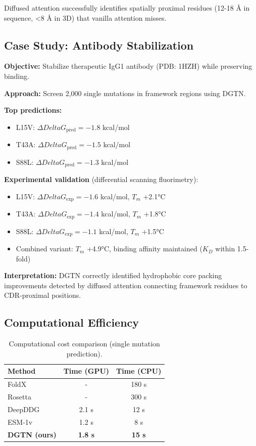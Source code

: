 \documentclass[11pt]{article}
\begin{document}
Diffused attention successfully identifies spatially proximal residues (12-18 Å in sequence, <8 Å in 3D) that vanilla attention misses.

\subsection{Case Study: Antibody Stabilization}

\textbf{Objective:} Stabilize therapeutic IgG1 antibody (PDB: 1HZH) while preserving binding.

\textbf{Approach:} Screen 2,000 single mutations in framework regions using DGTN.

\textbf{Top predictions:}
\begin{itemize}
    \item L15V: $\Delta Delta G_{\text{pred}} = -1.8$ kcal/mol
    \item T43A: $\Delta Delta G_{\text{pred}} = -1.5$ kcal/mol
    \item S88L: $\Delta Delta G_{\text{pred}} = -1.3$ kcal/mol
\end{itemize}

\textbf{Experimental validation} (differential scanning fluorimetry):
\begin{itemize}
    \item L15V: $\Delta Delta G_{\text{exp}} = -1.6$ kcal/mol, $T_m$ +2.1°C
    \item T43A: $\Delta Delta G_{\text{exp}} = -1.4$ kcal/mol, $T_m$ +1.8°C
    \item S88L: $\Delta Delta G_{\text{exp}} = -1.1$ kcal/mol, $T_m$ +1.5°C
    \item Combined variant: $T_m$ +4.9°C, binding affinity maintained ($K_D$ within 1.5-fold)
\end{itemize}

\textbf{Interpretation:} DGTN correctly identified hydrophobic core packing improvements detected by diffused attention connecting framework residues to CDR-proximal positions.

\subsection{Computational Efficiency}

\begin{table}[t]
\centering
\caption{Computational cost comparison (single mutation prediction).}
\label{tab:efficiency}
\begin{tabular}{lcc}
\toprule
\textbf{Method} & \textbf{Time (GPU)} & \textbf{Time (CPU)} \\
\midrule
FoldX & - & 180 s \\
Rosetta & - & 300 s \\
DeepDDG & 2.1 s & 12 s \\
ESM-1v & 1.2 s & 8 s \\
\textbf{DGTN (ours)} & \textbf{1.8 s} & \textbf{15 s} \\
\bottomrule
\end{tabular}
\end{table}
\end{document}
